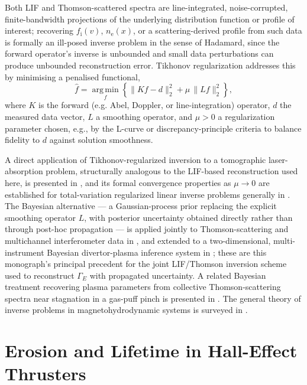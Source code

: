 Both LIF and Thomson-scattered spectra are line-integrated, noise-corrupted, finite-bandwidth projections of the underlying distribution function or profile of interest; recovering $f_{\mathrm{i}}(v)$, $n_{\mathrm{e}}(x)$, or a scattering-derived profile from such data is formally an ill-posed inverse problem in the sense of Hadamard, since the forward operator's inverse is unbounded and small data perturbations can produce unbounded reconstruction error. Tikhonov regularization addresses this by minimising a penalised functional,
\begin{equation}
\hat{f} = \operatorname*{arg\,min}_{f} \left\{ \lVert K f - d \rVert_{2}^{2} + \mu \,\lVert L f \rVert_{2}^{2} \right\},
\label{eq:annot:tikhonov}
\end{equation}
where $K$ is the forward (e.g. Abel, Doppler, or line-integration) operator, $d$ the measured data vector, $L$ a smoothing operator, and $\mu>0$ a regularization parameter chosen, e.g., by the L-curve or discrepancy-principle criteria to balance fidelity to $d$ against solution smoothness.

A direct application of Tikhonov-regularized inversion to a tomographic laser-absorption problem, structurally analogous to the LIF-based reconstruction used here, is presented in \cite{ref0677}, and its formal convergence properties as $\mu \to 0$ are established for total-variation regularized linear inverse problems generally in \cite{ref0692}. The Bayesian alternative --- a Gaussian-process prior replacing the explicit smoothing operator $L$, with posterior uncertainty obtained directly rather than through post-hoc propagation --- is applied jointly to Thomson-scattering and multichannel interferometer data in \cite{ref0683}, and extended to a two-dimensional, multi-instrument Bayesian divertor-plasma inference system in \cite{ref0685}; these are this monograph's principal precedent for the joint LIF/Thomson inversion scheme used to reconstruct $\Gamma_{E}$ with propagated uncertainty. A related Bayesian treatment recovering plasma parameters from collective Thomson-scattering spectra near stagnation in a gas-puff pinch is presented in \cite{ref0684}. The general theory of inverse problems in magnetohydrodynamic systems is surveyed in \cite{ref0687}.

\section{Erosion and Lifetime in Hall-Effect Thrusters}
\label{app:annot:hall-erosion}

